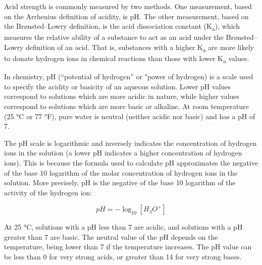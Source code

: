 Acid strength is commonly measured by two methods. One measurement, based on the Arrhenius definition of acidity, is pH. The other measurement, based on the Brønsted--Lowry definition, is the acid dissociation constant (K\textsubscript{a}), which measures the relative ability of a substance to act as an acid under the Brønsted--Lowry definition of an acid. That is, substances with a higher K\textsubscript{a} are more likely to donate hydrogen ions in chemical reactions than those with lower K\textsubscript{a} values.

In chemistry, pH (``potential of hydrogen'' or "power of hydrogen) is a scale used to specify the acidity or basicity of an aqueous solution. Lower pH values correspond to solutions which are more acidic in nature, while higher values correspond to solutions which are more basic or alkaline. At room temperature (25 °C or 77 °F), pure water is neutral (neither acidic nor basic) and has a pH of 7.

The pH scale is logarithmic and inversely indicates the concentration of hydrogen ions in the solution (a lower pH indicates a higher concentration of hydrogen ions). This is because the formula used to calculate pH approximates the negative of the base 10 logarithm of the molar concentration of hydrogen ions in the solution. More precisely, pH is the negative of the base 10 logarithm of the activity of the hydrogen ion:

\[pH = - \log_{10} [H_3O^+]\]

At 25 °C, solutions with a pH less than 7 are acidic, and solutions with a pH greater than 7 are basic. The neutral value of the pH depends on the temperature, being lower than 7 if the temperature increases. The pH value can be less than 0 for very strong acids, or greater than 14 for very strong bases.

